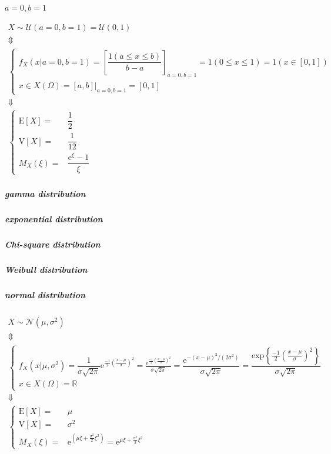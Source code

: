 \documentclass[
]{book}
\theoremstyle{definition}
\theoremstyle{definition}
\theoremstyle{definition}
\theoremstyle{definition}
\theoremstyle{remark}
\begin{document}
\(a=0,b=1\)

\[
\begin{array}{c}
X\sim\mathcal{U}\left(a=0,b=1\right)=\mathcal{U}\left(0,1\right)\\
\Updownarrow\\
\begin{cases}
f_{{\scriptscriptstyle X}}\left(x|a=0,b=1\right)=\left[\dfrac{1\left(a\le x\le b\right)}{b-a}\right]_{{\scriptscriptstyle a=0,b=1}}=1\left(0\le x\le1\right)=1\left(x\in\left[0,1\right]\right)\\
x\in X\left(\Omega\right)=\left[a,b\right]|_{{\scriptscriptstyle a=0,b=1}}=\left[0,1\right]
\end{cases}\\
\Downarrow\\
\begin{cases}
\mathrm{E}\left[X\right]= & \dfrac{1}{2}\\
\mathrm{V}\left[X\right]= & \dfrac{1}{12}\\
M_{{\scriptscriptstyle X}}\left(\xi\right)= & \dfrac{\mathrm{e}^{\xi}-1}{\xi}
\end{cases}
\end{array}
\]

\subparagraph{gamma distribution}\label{gamma-distribution}

\subparagraph{exponential distribution}\label{exponential-distribution}

\subparagraph{Chi-square distribution}\label{chi-square-distribution}

\subparagraph{Weibull distribution}\label{weibull-distribution}

\subparagraph{normal distribution}\label{normal-distribution}

\[
\begin{array}{c}
X\sim\mathcal{N}\left(\mu,\sigma^{2}\right)\\
\Updownarrow\\
\begin{cases}
f_{{\scriptscriptstyle X}}\left(x|\mu,\sigma^{2}\right)=\dfrac{1}{\sigma\sqrt{2\pi}}\mathrm{e}^{\frac{-1}{2}\left(\frac{x-\mu}{\sigma}\right)^{2}}=\frac{\mathrm{e}^{\frac{-1}{2}\left(\frac{x-\mu}{\sigma}\right)^{2}}}{\sigma\sqrt{2\pi}}=\dfrac{\mathrm{e}^{-\left(x-\mu\right)^{2}/\left(2\sigma^{2}\right)}}{\sigma\sqrt{2\pi}}=\dfrac{\mathrm{exp}\left\{ \frac{-1}{2}\left(\frac{x-\mu}{\sigma}\right)^{2}\right\} }{\sigma\sqrt{2\pi}}\\
x\in X\left(\Omega\right)=\mathbb{R}
\end{cases}\\
\Downarrow\\
\begin{cases}
\mathrm{E}\left[X\right]= & \mu\\
\mathrm{V}\left[X\right]= & \sigma^{2}\\
M_{{\scriptscriptstyle X}}\left(\xi\right)= & \mathrm{e}^{\left(\mu\xi+\frac{\sigma^{2}}{2}\xi^{2}\right)}=\mathrm{e}^{\mu\xi+\frac{\sigma^{2}}{2}\xi^{2}}
\end{cases}
\end{array}
\]
\end{document}
